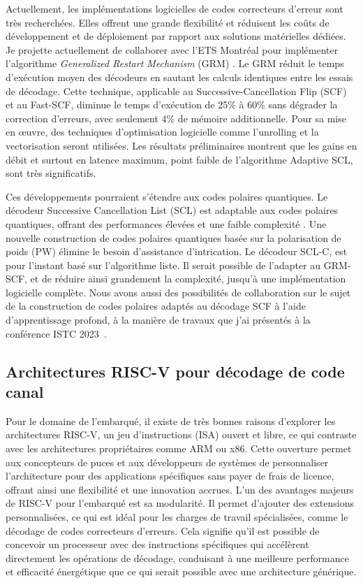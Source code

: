 \documentclass[11pt]{report}
\begin{document}
Actuellement, les implémentations logicielles de codes correcteurs d'erreur sont très recherchées. Elles offrent une grande flexibilité et réduisent les coûts de développement et de déploiement par rapport aux solutions matérielles dédiées. Je projette actuellement de collaborer avec l'ETS Montréal pour implémenter l'algorithme \textit{Generalized Restart Mechanism} (GRM) \cite{Sagitov2025}. Le GRM réduit le temps d'exécution moyen des décodeurs en sautant les calculs identiques entre les essais de décodage. Cette technique, applicable au Successive-Cancellation Flip (SCF) et au Fast-SCF, diminue le temps d'exécution de 25\% à 60\% sans dégrader la correction d'erreurs, avec seulement 4\% de mémoire additionnelle. Pour sa mise en œuvre, des techniques d'optimisation logicielle comme l'unrolling et la vectorisation seront utilisées. Les résultats préliminaires montrent que les gains en débit et surtout en latence maximum, point faible de l'algorithme Adaptive SCL, sont très significatifs.

Ces développements pourraient s'étendre aux codes polaires quantiques. Le décodeur Successive Cancellation List (SCL) est adaptable aux codes polaires quantiques, offrant des performances élevées et une faible complexité \cite{Gong2024}. Une nouvelle construction de codes polaires quantiques basée sur la polarisation de poids (PW) élimine le besoin d'assistance d'intrication. Le décodeur SCL-C, est pour l'instant basé sur l'algorithme liste. Il serait possible de l'adapter au GRM-SCF, et de réduire ainsi grandement la complexité, jusqu'à une implémentation logicielle complète. Nous avons aussi des possibilités de collaboration sur le sujet de la construction de codes polaires adaptés au décodage SCF à l'aide d'apprentissage profond, à la manière de travaux que j'ai présentés à la conférence ISTC 2023~\cite{leonardon:hal-03291030}.

\subsection{Architectures RISC-V pour décodage de code canal}

Pour le domaine de l'embarqué, il existe de très bonnes raisons d'explorer les architectures RISC-V, un jeu d'instructions (ISA) ouvert et libre, ce qui contraste avec les architectures propriétaires comme ARM ou x86. Cette ouverture permet aux concepteurs de puces et aux développeurs de systèmes de personnaliser l'architecture pour des applications spécifiques sans payer de frais de licence, offrant ainsi une flexibilité et une innovation accrues.
L'un des avantages majeurs de RISC-V pour l'embarqué est sa modularité. Il permet d'ajouter des extensions personnalisées, ce qui est idéal pour les charges de travail spécialisées, comme le décodage de codes correcteurs d'erreurs. Cela signifie qu'il est possible de concevoir un processeur avec des instructions spécifiques qui accélèrent directement les opérations de décodage, conduisant à une meilleure performance et efficacité énergétique que ce qui serait possible avec une architecture générique.
\end{document}

